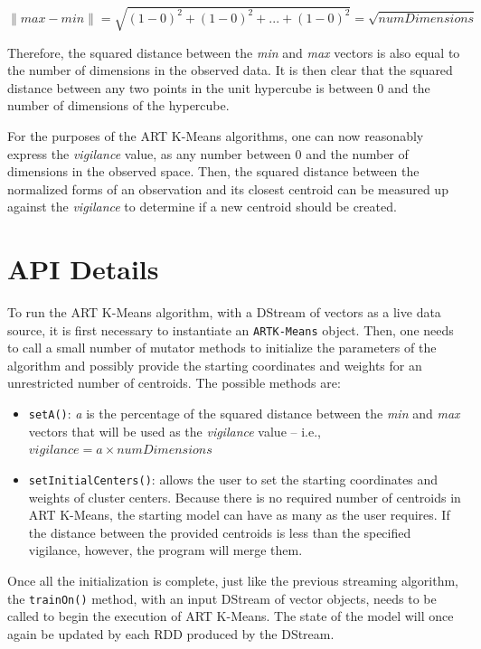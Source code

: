 \documentclass{l4proj}
\begin{document}
$$\|max - min\| = \sqrt{(1-0)^2 + (1-0)^2 + ... + (1-0)^2} = \sqrt{numDimensions}$$

\noindent Therefore, the squared distance between the \textit{min} and \textit{max} vectors is also equal to the number of dimensions in the observed data. It is then clear that the squared distance between any two points in the unit hypercube is between 0 and the number of dimensions of the hypercube. 

For the purposes of the ART K-Means algorithms, one can now reasonably express the \textit{vigilance} value, as any number between 0 and the number of dimensions in the observed space. Then, the squared distance between the normalized forms of an observation and its closest centroid can be measured up against the \textit{vigilance} to determine if a new centroid should be created.

\section{API Details}

To run the ART K-Means algorithm, with a DStream of vectors as a live data source, it is first necessary to instantiate an \texttt{ARTK-Means} object. Then, one needs to call a small number of mutator methods to initialize the parameters of the algorithm and possibly provide the starting coordinates and weights for an unrestricted number of centroids. The possible methods are:

\begin{itemize}
\item \texttt{setA()}: \textit{a} is the percentage of the squared distance between the \textit{min} and \textit{max} vectors that will be used as the \textit{vigilance} value -- i.e., $vigilance = a \times numDimensions$
\item \texttt{setInitialCenters()}: allows the user to set the starting coordinates and weights of cluster centers. Because there is no required number of centroids in ART K-Means, the starting model can have as many as the user requires. If the distance between the provided centroids is less than the specified vigilance, however, the program will merge them.
\end{itemize}

Once all the initialization is complete, just like the previous streaming algorithm, the \texttt{trainOn()} method, with an input DStream of vector objects, needs to be called to begin the execution of ART K-Means. The state of the model will once again be updated by each RDD produced by the DStream.
\end{document}
